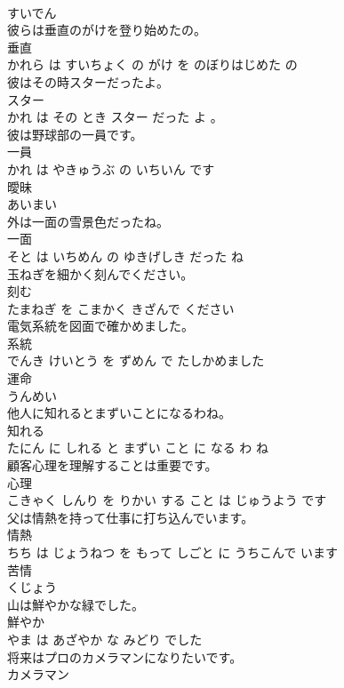 \documentclass[8pt]{extreport}
\begin{document}
\begin{CJK}{UTF8}{min}
\\	すいでん		
\\	彼らは垂直のがけを登り始めたの。	
\\	垂直 
\\	かれら は すいちょく の がけ を のぼりはじめた の			
\\	彼はその時スターだったよ。	
\\	スター 
\\	かれ は その とき スター だった よ 。			
\\	彼は野球部の一員です。	
\\	一員 
\\	かれ は やきゅうぶ の いちいん です			
\\	曖昧	
\\	あいまい		
\\	外は一面の雪景色だったね。	
\\	一面 
\\	そと は いちめん の ゆきげしき だった ね			
\\	玉ねぎを細かく刻んでください。	
\\	刻む 
\\	たまねぎ を こまかく きざんで ください			
\\	電気系統を図面で確かめました。	
\\	系統 
\\	でんき けいとう を ずめん で たしかめました			
\\	運命	
\\	うんめい		
\\	他人に知れるとまずいことになるわね。	
\\	知れる 
\\	たにん に しれる と まずい こと に なる わ ね			
\\	顧客心理を理解することは重要です。	
\\	心理 
\\	こきゃく しんり を りかい する こと は じゅうよう です			
\\	父は情熱を持って仕事に打ち込んでいます。	
\\	情熱 
\\	ちち は じょうねつ を もって しごと に うちこんで います			
\\	苦情	
\\	くじょう		
\\	山は鮮やかな緑でした。	
\\	鮮やか 
\\	やま は あざやか な みどり でした			
\\	将来はプロのカメラマンになりたいです。	
\\	カメラマン 

\end{CJK}
\end{document}
